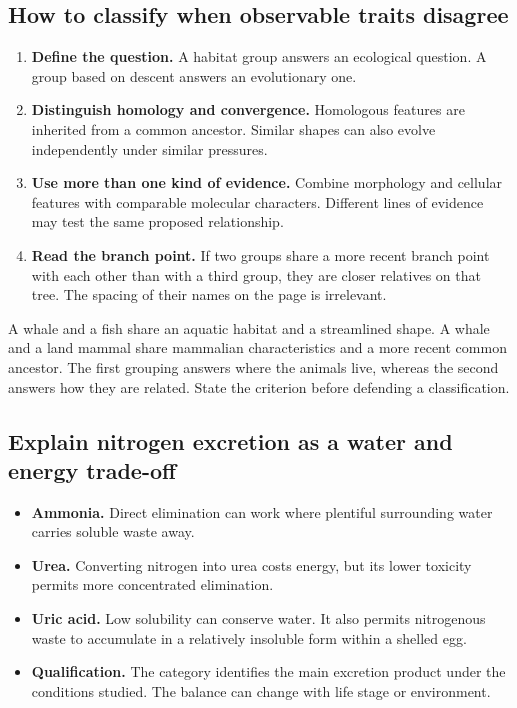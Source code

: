 \documentclass[12pt,a4paper]{article}
\begin{document}
\subsection{How to classify when observable traits disagree}
\begin{enumerate}[leftmargin=*, itemsep=2pt]
  \item \textbf{Define the question.} A habitat group answers an ecological question. A group based on descent answers an evolutionary one.
  \item \textbf{Distinguish homology and convergence.} Homologous features are inherited from a common ancestor. Similar shapes can also evolve independently under similar pressures.
  \item \textbf{Use more than one kind of evidence.} Combine morphology and cellular features with comparable molecular characters. Different lines of evidence may test the same proposed relationship.
  \item \textbf{Read the branch point.} If two groups share a more recent branch point with each other than with a third group, they are closer relatives on that tree. The spacing of their names on the page is irrelevant.
\end{enumerate}

\begin{tcolorbox}[examplebox, title={Compare a whale, a fish and a land mammal}]
A whale and a fish share an aquatic habitat and a streamlined shape. A whale and a land mammal share mammalian characteristics and a more recent common ancestor. The first grouping answers where the animals live, whereas the second answers how they are related. State the criterion before defending a classification.
\end{tcolorbox}

\subsection{Explain nitrogen excretion as a water and energy trade-off}
\begin{itemize}[leftmargin=*, itemsep=2pt]
  \item \textbf{Ammonia.} Direct elimination can work where plentiful surrounding water carries soluble waste away.
  \item \textbf{Urea.} Converting nitrogen into urea costs energy, but its lower toxicity permits more concentrated elimination.
  \item \textbf{Uric acid.} Low solubility can conserve water. It also permits nitrogenous waste to accumulate in a relatively insoluble form within a shelled egg.
  \item \textbf{Qualification.} The category identifies the main excretion product under the conditions studied. The balance can change with life stage or environment.
\end{itemize}
\end{document}
